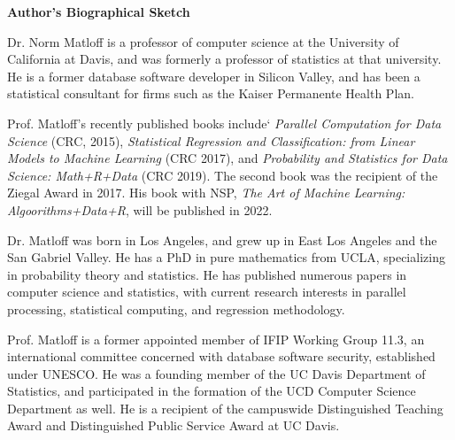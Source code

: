 \begin{center}
{\bf Author's Biographical Sketch}
\end{center}

Dr. Norm Matloff is a professor of computer science at the University of
California at Davis, and was formerly a professor of statistics at that
university. He is a former database software developer in Silicon
Valley, and has been a statistical consultant for firms such as the
Kaiser Permanente Health Plan.

Prof. Matloff's recently published books include` \textit{Parallel
Computation for Data Science} (CRC, 2015), \textit{Statistical
Regression and Classification: from Linear Models to Machine Learning}
(CRC 2017), and \textit{Probability and Statistics for Data Science:
Math+R+Data} (CRC 2019).  The second book was the recipient of the
Ziegal Award in 2017.  His book with NSP, 
\textit{The Art of Machine Learning: Algoorithms+Data+R}, will be
published in 2022.

\subtitle{Algorithms+Data+R}


Dr. Matloff was born in Los Angeles, and grew up in East Los Angeles and
the San Gabriel Valley. He has a PhD in pure mathematics from UCLA,
specializing in probability theory and statistics.  He has published
numerous papers in computer science and statistics, with current
research interests in parallel processing, statistical computing,
and regression methodology.

Prof. Matloff is a former appointed member of IFIP Working Group 11.3,
an international committee concerned with database software security,
established under UNESCO.  He was a founding member of the UC Davis
Department of Statistics, and participated in the formation of the UCD
Computer Science Department as well.  He is a recipient of the
campuswide Distinguished Teaching Award and Distinguished Public Service
Award at UC Davis.

